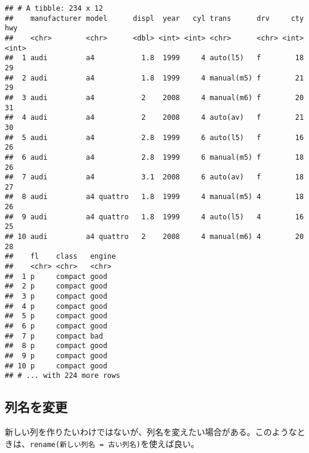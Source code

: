 \documentclass[]{book}
\newenvironment{Shaded}{\begin{snugshade}}{\end{snugshade}}
\newcommand{\KeywordTok}[1]{\textcolor[rgb]{0.13,0.29,0.53}{\textbf{#1}}}
\newcommand{\DataTypeTok}[1]{\textcolor[rgb]{0.13,0.29,0.53}{#1}}
\newcommand{\DecValTok}[1]{\textcolor[rgb]{0.00,0.00,0.81}{#1}}
\newcommand{\StringTok}[1]{\textcolor[rgb]{0.31,0.60,0.02}{#1}}
\newcommand{\CommentTok}[1]{\textcolor[rgb]{0.56,0.35,0.01}{\textit{#1}}}
\newcommand{\OperatorTok}[1]{\textcolor[rgb]{0.81,0.36,0.00}{\textbf{#1}}}
\newcommand{\NormalTok}[1]{#1}
\begin{document}
\begin{Shaded}
\end{Shaded}

\begin{verbatim}
## # A tibble: 234 x 12
##    manufacturer model      displ  year   cyl trans      drv     cty   hwy
##    <chr>        <chr>      <dbl> <int> <int> <chr>      <chr> <int> <int>
##  1 audi         a4           1.8  1999     4 auto(l5)   f        18    29
##  2 audi         a4           1.8  1999     4 manual(m5) f        21    29
##  3 audi         a4           2    2008     4 manual(m6) f        20    31
##  4 audi         a4           2    2008     4 auto(av)   f        21    30
##  5 audi         a4           2.8  1999     6 auto(l5)   f        16    26
##  6 audi         a4           2.8  1999     6 manual(m5) f        18    26
##  7 audi         a4           3.1  2008     6 auto(av)   f        18    27
##  8 audi         a4 quattro   1.8  1999     4 manual(m5) 4        18    26
##  9 audi         a4 quattro   1.8  1999     4 auto(l5)   4        16    25
## 10 audi         a4 quattro   2    2008     4 manual(m6) 4        20    28
##    fl    class   engine
##    <chr> <chr>   <chr> 
##  1 p     compact good  
##  2 p     compact good  
##  3 p     compact good  
##  4 p     compact good  
##  5 p     compact good  
##  6 p     compact good  
##  7 p     compact bad   
##  8 p     compact good  
##  9 p     compact good  
## 10 p     compact good  
## # ... with 224 more rows
\end{verbatim}

\subsection{列名を変更}

新しい列を作りたいわけではないが、列名を変えたい場合がある。このようなときは、\texttt{rename(新しい列名\ =\ 古い列名)}を使えば良い。

\begin{Shaded}
\end{Shaded}
\end{document}
